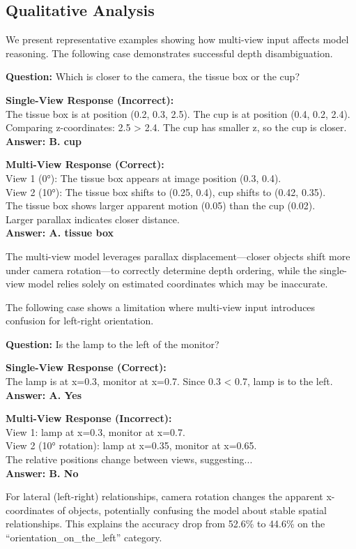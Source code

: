 \subsection{Qualitative Analysis}

We present representative examples showing how multi-view input affects model reasoning. The following case demonstrates successful depth disambiguation.

\begin{promptbox}
\small
\textbf{Question:} Which is closer to the camera, the tissue box or the cup?

\textbf{Single-View Response (Incorrect):}\\
The tissue box is at position (0.2, 0.3, 2.5). The cup is at position (0.4, 0.2, 2.4). Comparing z-coordinates: 2.5 > 2.4. The cup has smaller z, so the cup is closer.\\
\textbf{Answer: B. cup} \textcolor{red}{}

\textbf{Multi-View Response (Correct):}\\
View 1 (0°): The tissue box appears at image position (0.3, 0.4).\\
View 2 (10°): The tissue box shifts to (0.25, 0.4), cup shifts to (0.42, 0.35).\\
The tissue box shows larger apparent motion (0.05) than the cup (0.02).\\
Larger parallax indicates closer distance.\\
\textbf{Answer: A. tissue box} \textcolor{green}{}
\end{promptbox}

The multi-view model leverages parallax displacement---closer objects shift more under camera rotation---to correctly determine depth ordering, while the single-view model relies solely on estimated coordinates which may be inaccurate.

The following case shows a limitation where multi-view input introduces confusion for left-right orientation.

\begin{promptbox}
\small
\textbf{Question:} Is the lamp to the left of the monitor?

\textbf{Single-View Response (Correct):}\\
The lamp is at x=0.3, monitor at x=0.7. Since 0.3 < 0.7, lamp is to the left.\\
\textbf{Answer: A. Yes} \textcolor{green}{}

\textbf{Multi-View Response (Incorrect):}\\
View 1: lamp at x=0.3, monitor at x=0.7.\\
View 2 (10° rotation): lamp at x=0.35, monitor at x=0.65.\\
The relative positions change between views, suggesting...\\
\textbf{Answer: B. No} \textcolor{red}{}
\end{promptbox}

For lateral (left-right) relationships, camera rotation changes the apparent x-coordinates of objects, potentially confusing the model about stable spatial relationships. This explains the accuracy drop from 52.6\% to 44.6\% on the ``orientation\_on\_the\_left'' category.
